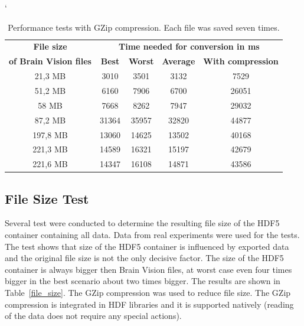 \documentclass[conference]{IEEEtran}
\begin{document}
\begin{table}
	\catcode`
	\centering
	\caption{Performance tests with GZip compression. Each file was saved seven times.}
	\label{speed_test}
	\begin{tabular}{|c|c|c|c|c|}
		\hline
		\textbf{File size} & \multicolumn{4}{c|}{\textbf{Time needed for conversion in ms}}\\
		\cline{2-5}		
		\textbf{ of Brain Vision files}	&\textbf{Best} & \textbf{Worst} & \textbf{Average} & \textbf{With compression}\\
		\hline
		\hline 21,3 MB & 3010 & 3501  & 3132& 7529 \\ 	
		\hline 51,2 MB & 6160  & 7906 & 6700 & 26051\\
		\hline 58 MB & 7668 &  8262 &  7947& 29032\\
		\hline 87,2 MB & 31364 & 35957 & 32820& 44877\\
		\hline 197,8 MB & 13060  & 14625 &  13502& 40168\\ 		
		\hline 221,3 MB & 14589 & 16321 & 15197& 42679 \\
		\hline 221,6 MB & 14347  & 16108 & 14871& 43586\\
		\hline
	\end{tabular}
\end{table}


\subsection{File Size Test}
Several test were conducted to determine the resulting file size of the HDF5 container containing all data. Data from real experiments were used for the tests. The test shows that size of the HDF5 container is influenced by exported data and the original file size is not the only decisive factor. The size of the HDF5 container is always bigger then Brain Vision files, at worst case even four times bigger in the best scenario about two times bigger. The results are shown in Table~\ref{file_size}. The GZip compression was used to reduce file size. The GZip compression is integrated in HDF libraries and it is supported natively (reading of the data does not require any special actions).
\end{document}
